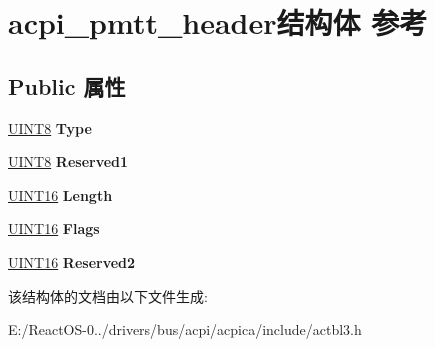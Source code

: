 \hypertarget{structacpi__pmtt__header}{}\section{acpi\+\_\+pmtt\+\_\+header结构体 参考}
\label{structacpi__pmtt__header}
\subsection*{Public 属性}
\begin{DoxyCompactItemize}
\item 
\mbox{\label{structacpi__pmtt__header_a92f94e5a05f56d00a6cfe0cf344b06ef}} 
\hyperlink{_processor_bind_8h_ab27e9918b538ce9d8ca692479b375b6a}{U\+I\+N\+T8} {\bfseries Type}
\item 
\mbox{\label{structacpi__pmtt__header_a0a7d584a9b9fe10fd30d91cfc0da62d8}} 
\hyperlink{_processor_bind_8h_ab27e9918b538ce9d8ca692479b375b6a}{U\+I\+N\+T8} {\bfseries Reserved1}
\item 
\mbox{\label{structacpi__pmtt__header_a76fb9076632bf6c37ffe4403576d4ed1}} 
\hyperlink{_processor_bind_8h_a09f1a1fb2293e33483cc8d44aefb1eb1}{U\+I\+N\+T16} {\bfseries Length}
\item 
\mbox{\label{structacpi__pmtt__header_aabf6a0b1f3c39090d3ca8f90e7ad186d}} 
\hyperlink{_processor_bind_8h_a09f1a1fb2293e33483cc8d44aefb1eb1}{U\+I\+N\+T16} {\bfseries Flags}
\item 
\mbox{\label{structacpi__pmtt__header_a4e44319502c072b42a18a36884a8d5c9}} 
\hyperlink{_processor_bind_8h_a09f1a1fb2293e33483cc8d44aefb1eb1}{U\+I\+N\+T16} {\bfseries Reserved2}
\end{DoxyCompactItemize}


该结构体的文档由以下文件生成\+:\begin{DoxyCompactItemize}
\item 
E\+:/\+React\+O\+S-\/0../drivers/bus/acpi/acpica/include/actbl3.\+h\end{DoxyCompactItemize}
